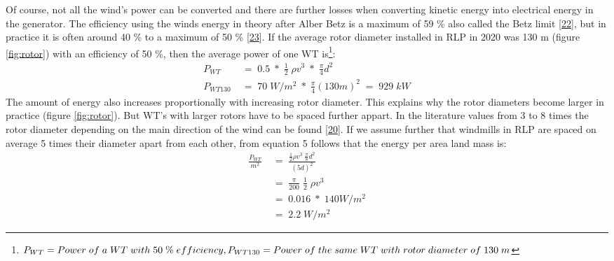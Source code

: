 \documentclass[a4paper,11pt]{article}
\begin{document}
Of course, not all the wind's power can be converted and there are further losses when converting kinetic energy into electrical energy in the generator. The efficiency using the winds energy in theory after Alber Betz is a maximum of 59 \% also called the Betz limit {[}\protect\hyperlink{ref-A.Betz.1920}{22}{]}, but in practice it is often around 40 \% to a maximum of 50 \% {[}\protect\hyperlink{ref-WindwartsEnergieausdemNorden.2021}{23}{]}. If the average rotor diameter installed in RLP in 2020 was 130 m (figure \ref{fig:rotor}) with an efficiency of 50 \%, then the average power of one WT is\footnote{\(P_{WT}=Power\; of\; a\; WT\; with\; 50\; \%\; efficiency,\;\\ P_{WT130}=Power\; of\; the\; same\; WT\; with\; rotor\; diameter\; of\; 130\; m\)}:
\begin{equation}
\begin{split}
P_{WT}\; & =\; 0.5\; *\; \frac{1}{2}\; \rho v^3\; *\; \frac{\pi}{4}d^2 \\
P_{WT130}\; & =\; 70\; W/m^2\; *\; \frac{\pi}{4}(130 m)^2\; =\; 929\; kW
\end{split}
\end{equation}
The amount of energy also increases proportionally with increasing rotor diameter. This explains why the rotor diameters become larger in practice (figure \ref{fig:rotor}). But WT's with larger rotors have to be spaced further appart. In the literature values from 3 to 8 times the rotor diameter depending on the main direction of the wind can be found {[}\protect\hyperlink{ref-DavidJCMacKay.2009}{20}{]}. If we assume further that windmills in RLP are spaced on average 5 times their diameter apart from each other, from equation 5 follows that the energy per area land mass is:
\begin{equation}
\begin{split}
\frac{P_{WT}}{m^2}\; & =\; \frac{\frac{1}{2} \rho v^3\; \frac{\pi}{8}d^2}{(5d)^2} \\
 & =\; \frac{\pi}{200}\; \frac{1}{2}\; \rho v^3 \\
 & =\; 0.016\; *\; 140 W/m^2 \\
 & =\; 2.2\; W/m^2
\end{split}
\end{equation}
\end{document}
